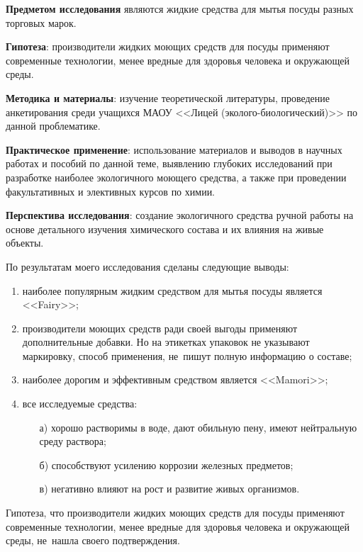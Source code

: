 \textbf{Предметом исследования} являются жидкие средства для мытья посуды разных торговых марок.

\textbf{Гипотеза}: производители жидких моющих средств для посуды применяют современные технологии, менее вредные для здоровья человека и окружающей среды.

\textbf{Методика и материалы}: изучение теоретической литературы, проведение анкетирования среди учащихся МАОУ <<Лицей (эколого-биологический)>> по данной проблематике.

\textbf{Практическое применение}: использование материалов и выводов в  научных работах и пособий по данной теме, выявлению глубоких исследований при разработке наиболее экологичного моющего средства, а также при проведении факультативных и элективных курсов по химии.

\textbf{Перспектива исследования}: создание экологичного средства ручной работы на основе детального изучения химического состава и их влияния на живые объекты.

По результатам моего исследования сделаны следующие выводы:
\begin{enumerate}[noitemsep]\vspace{-8pt}
\item наиболее популярным жидким средством для мытья посуды является <<Fairy>>;
\item производители моющих средств ради своей выгоды применяют дополнительные добавки. Но на этикетках упаковок не указывают маркировку, способ применения, не~пишут полную информацию о составе;
\item наиболее дорогим и эффективным средством является <<Mamori>>;\\
\item все исследуемые средства:
\begin{itemize}[noitemsep]
  \item[а)] хорошо растворимы в воде, дают обильную пену, имеют нейтральную среду раствора;
  \item[б)] способствуют усилению коррозии железных предметов;
  \item[в)] негативно влияют на рост и развитие живых организмов.
\end{itemize}
\end{enumerate}\vspace{-8pt}

Гипотеза, что производители жидких моющих средств для посуды применяют современные технологии, менее вредные для здоровья человека и окружающей среды, не~нашла своего подтверждения.

